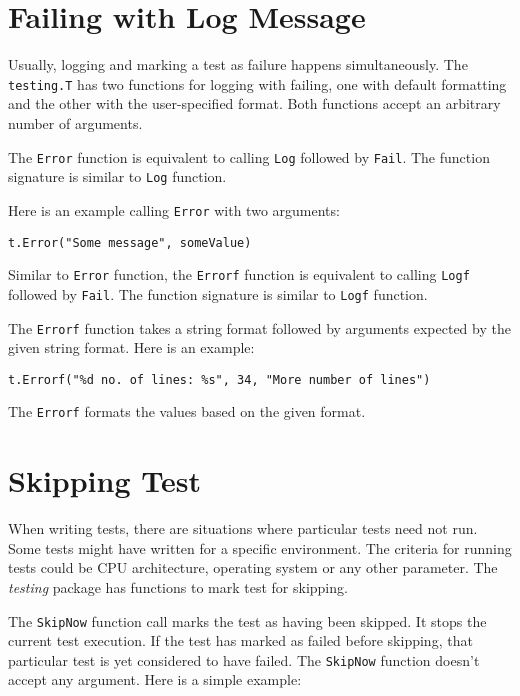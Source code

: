\section{Failing with Log Message}

Usually, logging and marking a test as failure happens simultaneously.
The \texttt{testing.T} has two functions for logging with failing, one
with default formatting and the other with the user-specified format.
Both functions accept an arbitrary number of arguments.

The \texttt{Error} function is equivalent to calling \texttt{Log}
followed by \texttt{Fail}.  The function signature is similar
to \texttt{Log} function.

Here is an example calling \texttt{Error} with two arguments:

\begin{lstlisting}[numbers=none]
t.Error("Some message", someValue)
\end{lstlisting}

Similar to \texttt{Error} function, the \texttt{Errorf} function is
equivalent to calling \texttt{Logf} followed by \texttt{Fail}.  The
function signature is similar to \texttt{Logf} function.

The \texttt{Errorf} function takes a string format followed by
arguments expected by the given string format.  Here is an example:

\begin{lstlisting}[numbers=none]
t.Errorf("%d no. of lines: %s", 34, "More number of lines")
\end{lstlisting}

The \texttt{Errorf} formats the values based on the given format.

\section{Skipping Test}

When writing tests, there are situations where particular tests need
not run.  Some tests might have written for a specific environment.
The criteria for running tests could be CPU architecture, operating
system or any other parameter.  The \textit{testing} package has
functions to mark test for skipping.

The \texttt{SkipNow} function call marks the test as having been
skipped.  It stops the current test execution.  If the test has marked
as failed before skipping, that particular test is yet considered to
have failed.  The \texttt{SkipNow} function doesn't accept any
argument.  Here is a simple example:


